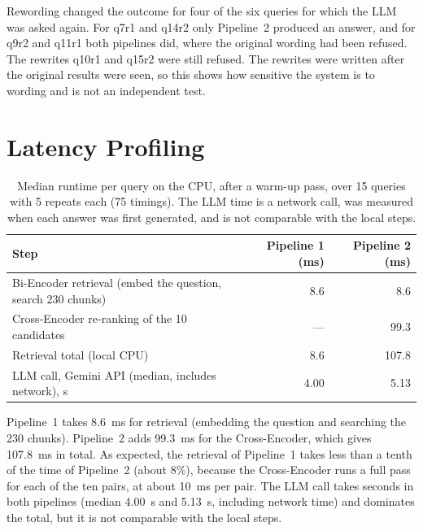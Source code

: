 \documentclass[11pt,a4paper]{article}
\begin{document}
Rewording changed the outcome for four of the six queries for which the LLM was asked again. For q7r1 and q14r2 only
Pipeline~2 produced an answer, and for q9r2 and q11r1 both pipelines did, where the original wording had been
refused. The rewrites q10r1 and q15r2 were still refused. The rewrites were written after the original results
were seen, so this shows how sensitive the system is to wording and is not an independent test.

\section{Latency Profiling}

\begin{table}[H]
\centering
\small
\renewcommand{\arraystretch}{1.15}
\begin{tabular}{@{}l r r@{}}
\toprule
Step & Pipeline 1 (ms) & Pipeline 2 (ms) \\
\midrule
Bi-Encoder retrieval (embed the question, search 230 chunks) & 8.6 & 8.6 \\
Cross-Encoder re-ranking of the 10 candidates & --- & 99.3 \\
\midrule
Retrieval total (local CPU) & 8.6 & 107.8 \\
\midrule
LLM call, Gemini API (median, includes network), s & 4.00 & 5.13 \\
\bottomrule
\end{tabular}
\caption{Median runtime per query on the CPU, after a warm-up pass, over 15 queries with 5 repeats each (75 timings). The LLM time is a network call, was measured when each answer was first generated, and is not comparable with the local steps.}
\label{tab:latency}
\end{table}

Pipeline~1 takes 8.6~ms for retrieval (embedding the question and searching the 230 chunks). Pipeline~2 adds
99.3~ms for the Cross-Encoder, which gives 107.8~ms in total. As expected, the retrieval of Pipeline~1 takes less
than a tenth of the time of Pipeline~2 (about 8\%), because the Cross-Encoder runs a full pass for each of the ten
pairs, at about 10~ms per pair. The LLM call takes seconds in both pipelines (median 4.00~s and 5.13~s, including
network time) and dominates the total, but it is not comparable with the local steps.

\end{document}
